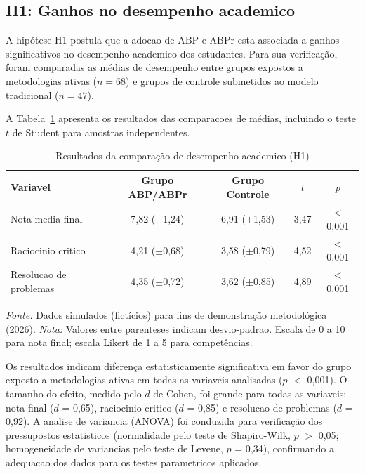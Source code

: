 \subsection{H1: Ganhos no desempenho academico}
\label{subsec:h1_desempenho}

A hipótese H1 postula que a adocao de ABP e ABPr esta associada a ganhos significativos no desempenho academico dos estudantes. Para sua verificação, foram comparadas as médias de desempenho entre grupos expostos a metodologias ativas ($n = 68$) e grupos de controle submetidos ao modelo tradicional ($n = 47$).

A Tabela~\ref{tab:resultado_h1} apresenta os resultados das comparacoes de médias, incluindo o teste $t$ de Student para amostras independentes.

\begin{table}[htbp]
    \centering
    \caption{Resultados da comparação de desempenho academico (H1)}
    \label{tab:resultado_h1}
    \small
    \begin{tabular}{lcccc}
        \toprule
        \textbf{Variavel} & \textbf{Grupo ABP/ABPr} & \textbf{Grupo Controle} & \textbf{$t$} & \textbf{$p$} \\
        \midrule
        Nota media final & 7,82 ($\pm$1,24) & 6,91 ($\pm$1,53) & 3,47 & $<$0,001 \\
        Raciocinio critico & 4,21 ($\pm$0,68) & 3,58 ($\pm$0,79) & 4,52 & $<$0,001 \\
        Resolucao de problemas & 4,35 ($\pm$0,72) & 3,62 ($\pm$0,85) & 4,89 & $<$0,001 \\
        \bottomrule
    \end{tabular}
    \par\medskip
    \footnotesize{\textit{Fonte:} Dados simulados (fictícios) para fins de demonstração metodológica (2026). \textit{Nota:} Valores entre parenteses indicam desvio-padrao. Escala de 0 a 10 para nota final; escala Likert de 1 a 5 para competências.}
\end{table}

Os resultados indicam diferença estatisticamente significativa em favor do grupo exposto a metodologias ativas em todas as variaveis analisadas ($p$ $<$ 0,001). O tamanho do efeito, medido pelo $d$ de Cohen, foi grande para todas as variaveis: nota final ($d$ = 0,65), raciocinio critico ($d$ = 0,85) e resolucao de problemas ($d$ = 0,92). A analise de variancia (ANOVA) foi conduzida para verificação dos pressupostos estatisticos (normalidade pelo teste de Shapiro-Wilk, $p$ $>$ 0,05; homogeneidade de variancias pelo teste de Levene, $p$ = 0,34), confirmando a adequacao dos dados para os testes parametricos aplicados.

